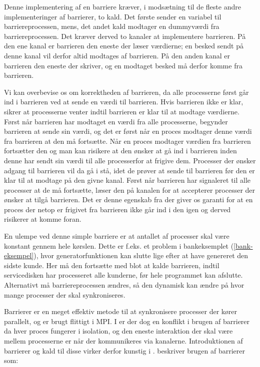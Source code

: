 Denne implementering af en barriere kræver, i modsætning til de fleste andre 
implementeringer af barrierer\cites{mpi-barrier, crew}, to kald. Det første 
sender en variabel til barriereprocessen, mens,
det andet kald modtager en dummyværdi fra barriereprocessen. Det kræver derved 
to kanaler at implementere barrieren. På den ene kanal er barrieren den eneste 
der læser værdierne; en besked sendt på denne kanal vil derfor altid modtages 
af barrieren. På den anden kanal er barrieren den eneste der skriver, og en 
modtaget besked må derfor komme fra barrieren.

Vi kan overbevise os om korrektheden af barrieren, da alle processerne først 
går ind i barrieren ved at sende en værdi til barrieren. Hvis barrieren ikke er 
klar, sikrer \csp at processerne venter indtil barrieren er klar til at modtage 
værdierne. Først når barrieren har modtaget en værdi fra alle processerne, 
begynder barrieren at sende sin værdi, og det er først når en proces modtager 
denne værdi fra barrieren at den må fortsætte. Når en proces modtager værdien 
fra barrieren fortsætter den og man kan risikere at den ønsker at gå ind i 
barrieren inden denne har sendt sin værdi til alle processerfor at frigive dem.
Processer der ønsker adgang til barrieren vil da gå i stå, idet de prøver at 
sende til barrieren før den er klar til at modtage på den givne kanal. Først 
når barrieren har signaleret til alle processer at de må fortsætte, læser den 
på kanalen for at accepterer processer der ønsker at tilgå barrieren. Det er 
denne egenskab fra \csp der giver os garanti for at en proces der netop er 
frigivet fra barrieren ikke går ind i den igen og derved risikerer at komme 
foran. 

En ulempe ved denne simple barriere er at antallet af processer skal være 
konstant gennem hele kørslen.
Dette er f.eks. et problem i bankeksemplet (\cref{bank-eksempel}), hvor 
generatorfunktionen kan slutte lige efter at have genereret den sidste kunde.  
Her må den fortsætte med blot at kalde barrieren, indtil servicedisken har 
processeret alle kunderne, før hele programmet kan afslutte. Alternativt må 
barriereprocessen ændres, så den dynamisk kan ændre på hvor mange processer der 
skal synkroniseres. 


Barrierer er en meget effektiv metode til at synkronisere processer der kører 
parallelt, og er brugt flittigt i MPI. I \csp er der dog en konflikt i brugen 
af barrierer da hver proces fungerer i isolation, og den eneste interaktion der 
skal være mellem processerne er når der kommunikeres via kanalerne. 
Introduktionen af barrierer og kald til disse virker derfor kunstig i \csp. 
\citeauthor{crew} beskriver brugen af barrierer som:

